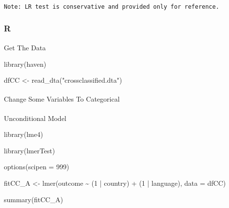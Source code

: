 \documentclass[
  letterpaper,
  DIV=11,
  numbers=noendperiod]{scrreprt}
\makeatletter
\let\oldparagraph\paragraph
\renewcommand{\paragraph}{
    \@ifstar
      \xxxParagraphStar
      \xxxParagraphNoStar
  }
\newcommand{\xxxParagraphStar}[1]{\oldparagraph*{#1}\mbox{}}
\newcommand{\xxxParagraphNoStar}[1]{\oldparagraph{#1}\mbox{}}
\newenvironment{Shaded}{\begin{snugshade}}{\end{snugshade}}
\newcommand{\AttributeTok}[1]{\textcolor[rgb]{0.40,0.45,0.13}{#1}}
\newcommand{\DecValTok}[1]{\textcolor[rgb]{0.68,0.00,0.00}{#1}}
\newcommand{\FunctionTok}[1]{\textcolor[rgb]{0.28,0.35,0.67}{#1}}
\newcommand{\NormalTok}[1]{\textcolor[rgb]{0.00,0.23,0.31}{#1}}
\newcommand{\OtherTok}[1]{\textcolor[rgb]{0.00,0.23,0.31}{#1}}
\newcommand{\SpecialCharTok}[1]{\textcolor[rgb]{0.37,0.37,0.37}{#1}}
\newcommand{\StringTok}[1]{\textcolor[rgb]{0.13,0.47,0.30}{#1}}
\makeatother
\begin{document}
\begin{verbatim}
Note: LR test is conservative and provided only for reference.
\end{verbatim}

\subsubsection{R}

\paragraph{Get The Data}\label{get-the-data-12}

\begin{Shaded}
\begin{Highlighting}[]
\FunctionTok{library}\NormalTok{(haven)}

\NormalTok{dfCC }\OtherTok{\textless{}{-}} \FunctionTok{read\_dta}\NormalTok{(}\StringTok{"crossclassified.dta"}\NormalTok{)}
\end{Highlighting}
\end{Shaded}

\paragraph{Change Some Variables To
Categorical}\label{change-some-variables-to-categorical-7}

\begin{Shaded}
\end{Shaded}

\paragraph{Unconditional Model}\label{unconditional-model-4}

\begin{Shaded}
\begin{Highlighting}[]
\FunctionTok{library}\NormalTok{(lme4) }

\FunctionTok{library}\NormalTok{(lmerTest)}

\FunctionTok{options}\NormalTok{(}\AttributeTok{scipen =} \DecValTok{999}\NormalTok{) }

\NormalTok{fitCC\_A }\OtherTok{\textless{}{-}} \FunctionTok{lmer}\NormalTok{(outcome }\SpecialCharTok{\textasciitilde{}}  
\NormalTok{                 (}\DecValTok{1} \SpecialCharTok{|}\NormalTok{ country) }\SpecialCharTok{+}
\NormalTok{                 (}\DecValTok{1} \SpecialCharTok{|}\NormalTok{ language),}
             \AttributeTok{data =}\NormalTok{ dfCC)}

\FunctionTok{summary}\NormalTok{(fitCC\_A)}
\end{Highlighting}
\end{Shaded}
\end{document}
